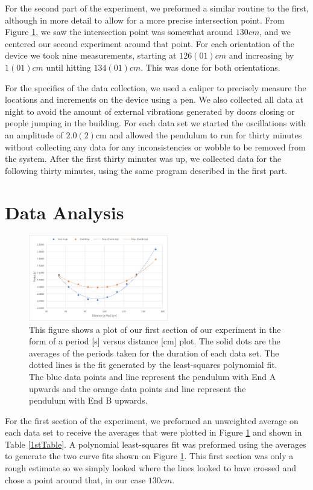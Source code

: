 \documentclass[aps,prl,10pt,twocolumn,floatfix]{revtex4-2}
\begin{document}
For the second part of the experiment, we preformed a similar routine to the first, although in more detail to allow for a more precise intersection point. 
From Figure \ref{1stGraph}, we saw the intersection point was somewhat around $130cm$, and we centered our second experiment around that point. 
For each orientation of the device we took nine measurements, starting at $126(01)cm$ and increasing by $1(01)cm$ until hitting $134(01)cm$. 
This was done for both orientations. 

For the specifics of the data collection, we used a caliper to precisely measure the locations and increments on the device using a pen.
We also collected all data at night to avoid the amount of external vibrations generated by doors closing or people jumping in the building. 
For each data set we started the oscillations with an amplitude of $2.0(2)$cm and allowed the pendulum to run for thirty minutes without collecting any data for any inconsistencies or wobble to be removed from the system. 
After the first thirty minutes was up, we collected data for the following thirty minutes, using the same program described in the first part. 


\section{Data Analysis}
\begin{figure}
\includegraphics[width=230px]{FirstMeasurement.png}
\caption{This figure shows a plot of our first section of our experiment in the form of a period [s] versus distance [cm] plot. The solid dots are the averages of the periods taken for the duration of each data set. The dotted lines is the fit generated by the least-squares polynomial fit. The blue data points and line represent the pendulum with End A upwards and the orange data points and line represent the pendulum with End B upwards.}
\label{1stGraph}
\end{figure}

For the first section of the experiment, we preformed an unweighted average on each data set to receive the averages that were plotted in Figure \ref{1stGraph} and shown in Table \ref{1stTable}.
A polynomial least-squares fit was preformed using the averages to generate the two curve fits shown on Figure \ref{1stGraph}. 
This first section was only a rough estimate so we simply looked where the lines looked to have crossed and chose a point around that, in our case $130cm$. 
\end{document}
